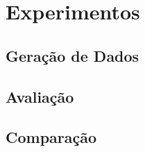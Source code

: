 \chapter{Experimentos}
\label{ch:experimentos}

%
\section{Geração de Dados}
\label{sec:geracaodados}

\section{Avaliação}
\label{sec:avaliacao}

\section{Comparação}
\label{sec:comparacao}


